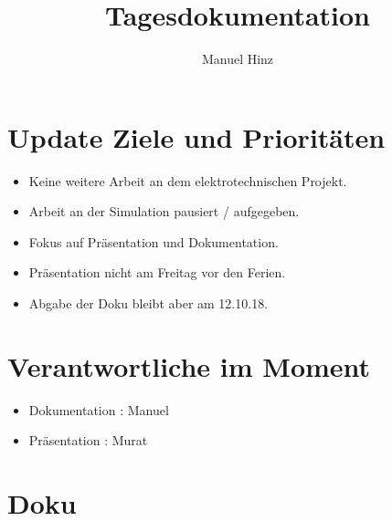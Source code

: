 \documentclass{article}
\author{Manuel Hinz}
\title{Tagesdokumentation}
\begin{document}
\maketitle

\section{Update Ziele und Priorit\"{a}ten}

\begin{itemize}

\item Keine weitere Arbeit an dem elektrotechnischen Projekt.

\item Arbeit an der Simulation pausiert / aufgegeben.

\item Fokus auf Pr\"{a}sentation und Dokumentation. 

\item Pr\"{a}sentation nicht am Freitag vor den Ferien.

\item Abgabe der Doku bleibt aber am 12.10.18.

\end{itemize}

\section{Verantwortliche im Moment}

\begin{itemize}

\item Dokumentation : Manuel

\item Pr\"{a}sentation : Murat

\end{itemize}

\section{Doku}
\end{document}
